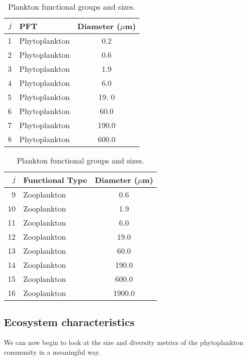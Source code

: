 \documentclass[11pt,fleqn]{book} %
\begin{document}
\begin{table}[htp!]
\begin{center}
\caption{Plankton functional groups and sizes.}
\begin{tabular}{rlc}
\hline
$j$     & PFT                   & \multicolumn{1}{r}{Diameter ($\mu$m)}  \\
\hline
1       & Phytoplankton         & 0.2  \\
2       & Phytoplankton         & 0.6  \\
3       & Phytoplankton         & 1.9  \\
4       & Phytoplankton         & 6.0  \\
5       & Phytoplankton         & 19. 0 \\
6       & Phytoplankton         & 60.0  \\
7       & Phytoplankton         & 190.0  \\
8       & Phytoplankton         & 600.0  \\
\hline
\end{tabular}
\begin{tabular}{rlc}
\hline
$j$     & Functional Type       & \multicolumn{1}{r}{Diameter ($\mu$m)}  \\
\hline
9       & Zooplankton           & 0.6  \\
10      & Zooplankton           & 1.9  \\
11      & Zooplankton           & 6.0  \\
12      & Zooplankton           & 19.0 \\
13      & Zooplankton           & 60.0  \\
14      & Zooplankton           & 190.0  \\
15      & Zooplankton           & 600.0  \\
16      & Zooplankton           & 1900.0  \\
\hline
\end{tabular}
\label{planktonconfig2}
\end{center}
\end{table}
\vspace{-4mm}


\subsection{Ecosystem characteristics} We can now begin to look at the size and diversity metrics of the phytoplankton community in a meaningful way.
\end{document}
